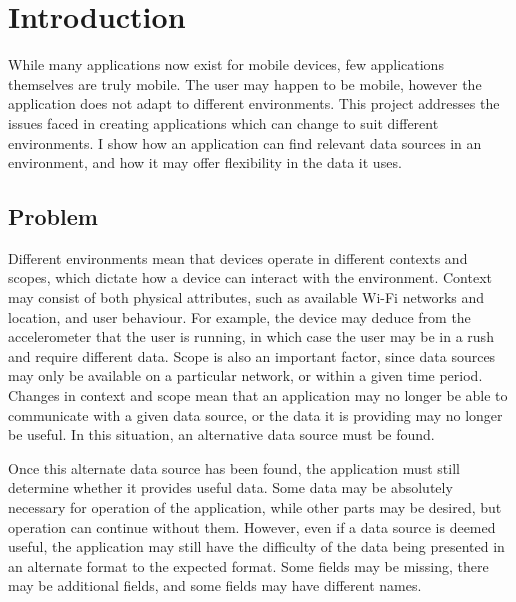 \documentclass[12pt,twoside,notitlepage]{report}
\begin{document}
\tableofcontents

\listoffigures

\newpage


\cleardoublepage        %

\setcounter{page}{1}
\pagestyle{headings}

\chapter{Introduction}

While many applications now exist for mobile devices, few applications themselves are truly mobile. 
The user may happen to be mobile, however the application does not adapt to different environments. 
This project addresses the issues faced in creating applications which can change to suit different environments. 
I show how an application can find relevant data sources in an environment, and how it may offer flexibility in the data it uses.

\section{Problem}
Different environments mean that devices operate in different contexts and scopes, which dictate how a device can interact with the environment. 
Context may consist of both physical attributes, such as available Wi-Fi networks and location, and user behaviour. 
For example, the device may deduce from the accelerometer that the user is running, in which case the user may be in a rush and require different data.
Scope is also an important factor, since data sources may only be available on a particular network, or within a given time period. 
Changes in context and scope mean that an application may no longer be able to communicate with a given data source, or the data it is providing may no longer be useful. 
In this situation, an alternative data source must be found.

Once this alternate data source has been found, the application must still determine whether it provides useful data. 
Some data may be absolutely necessary for operation of the application, while other parts may be desired, but operation can continue without them. 
However, even if a data source is deemed useful, the application may still have the difficulty of the data being presented in an alternate format to the expected format. 
Some fields may be missing, there may be additional fields, and some fields may have different names. 
\end{document}
